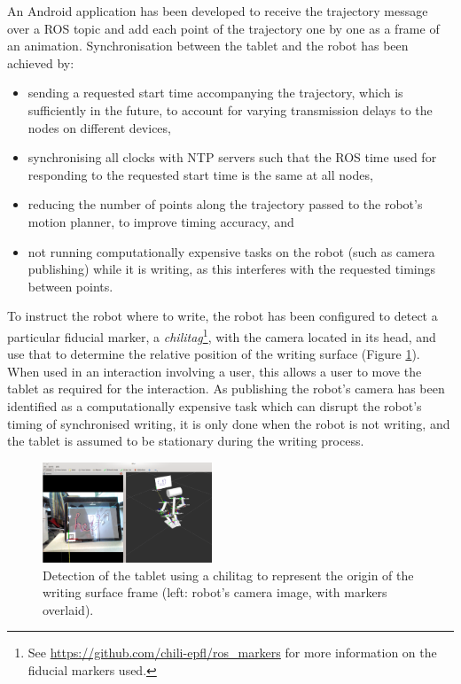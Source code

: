 \documentclass{sig-alternate}
\begin{document}
An Android application has been developed to receive the trajectory message over
a ROS topic and add each point of the trajectory one by one as a frame of an
animation. Synchronisation between the tablet and the robot has been achieved by:

\begin{itemize}

    \item sending a requested start time accompanying the trajectory, which is
        sufficiently in the future, to account for varying transmission delays
        to the nodes on different devices,

    \item synchronising all clocks with NTP servers such that the ROS time used
        for responding to the requested start time is the same at all nodes,

    \item reducing the number of points along the trajectory passed to the
        robot's motion planner, to improve timing accuracy, and

    \item not running computationally expensive tasks on the robot (such as
        camera publishing) while it is writing, as this interferes with the
        requested timings between points. 

\end{itemize}

To instruct the robot where to write, the robot has been configured to detect a
particular fiducial marker, a \emph{chilitag}\footnote{See
\url{https://github.com/chili-epfl/ros_markers} for more information on the
fiducial markers used.}, with the camera located in its head, and use that to
determine the relative position of the writing surface (Figure
\ref{fig:tabletDetection}). When used in an interaction involving a user, this
allows a user to move the tablet as required for the interaction. As publishing
the robot's camera has been identified as a computationally expensive task which
can disrupt the robot's timing of synchronised writing, it is only done when the
robot is not writing, and the tablet is assumed to be stationary during the
writing process.

\begin{figure}[htpb]
    \centering
    \includegraphics[width=0.45\textwidth]{figures/chilitagDetection_cameraOverlay.png}
    \caption[Detection of the tablet using a chilitag to represent the origin of
    the writing surface frame.]{\label{fig:tabletDetection}Detection of the
    tablet using a chilitag to represent the origin of the writing surface frame
(left: robot's camera image, with markers overlaid).}

\end{figure}%
%
%
\end{document}

